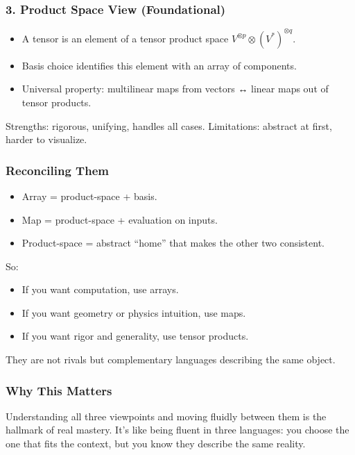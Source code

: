 \documentclass[
  letterpaper,
  DIV=11,
  numbers=noendperiod]{scrreprt}
\providecommand{\tightlist}{%
  \setlength{\itemsep}{0pt}\setlength{\parskip}{0pt}}
\begin{document}
\subsubsection{3. Product Space View
(Foundational)}\label{product-space-view-foundational}

\begin{itemize}
\tightlist
\item
  A tensor is an element of a tensor product space
  \(V^{\otimes p} \otimes (V^*)^{\otimes q}\).
\item
  Basis choice identifies this element with an array of components.
\item
  Universal property: multilinear maps from vectors ↔ linear maps out of
  tensor products.
\end{itemize}

Strengths: rigorous, unifying, handles all cases. Limitations: abstract
at first, harder to visualize.

\subsubsection{Reconciling Them}\label{reconciling-them}

\begin{itemize}
\tightlist
\item
  Array = product-space + basis.
\item
  Map = product-space + evaluation on inputs.
\item
  Product-space = abstract ``home'' that makes the other two consistent.
\end{itemize}

So:

\begin{itemize}
\tightlist
\item
  If you want computation, use arrays.
\item
  If you want geometry or physics intuition, use maps.
\item
  If you want rigor and generality, use tensor products.
\end{itemize}

They are not rivals but complementary languages describing the same
object.

\subsubsection{Why This Matters}\label{why-this-matters-9}

Understanding all three viewpoints and moving fluidly between them is
the hallmark of real mastery. It's like being fluent in three languages:
you choose the one that fits the context, but you know they describe the
same reality.
\end{document}
